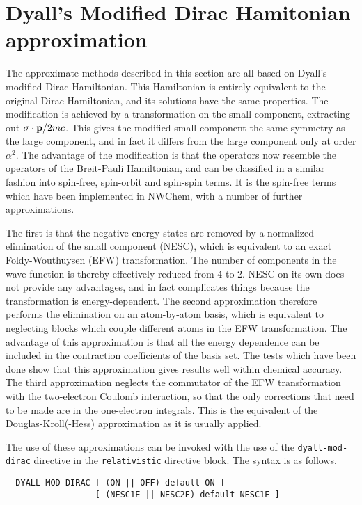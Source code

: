\section{Dyall's Modified Dirac Hamitonian approximation}
\label{sec:dyall-mod-dir}


The approximate methods described in this section are all based on Dyall's
modified Dirac Hamiltonian. This Hamiltonian is entirely equivalent to the
original Dirac Hamiltonian, and its solutions have the same properties.
The modification is achieved by a transformation on the small component,
extracting out \hbox{$\sigma\cdot{\bf p}/2mc$}. This gives the modified small
component the same symmetry as the large component, and in fact it differs
from the large component only at order $\alpha^2$.  The advantage of the
modification is that the operators now resemble the operators of the
Breit-Pauli Hamiltonian, and can be classified in a similar fashion into
spin-free, spin-orbit and spin-spin terms. It is the spin-free terms which
have been implemented in NWChem, with a number of further approximations.

The first is that the negative energy states are removed by a normalized
elimination of the small component (NESC), which is equivalent to an exact
Foldy-Wouthuysen (EFW) transformation. The number of components in the wave
function is thereby effectively reduced from 4 to 2. NESC on its own does
not provide any advantages, and in fact complicates things because the
transformation is energy-dependent. The second approximation therefore
performs the elimination on an atom-by-atom basis, which is equivalent to
neglecting blocks which couple different atoms in the EFW transformation.
The advantage of this approximation is that all the energy dependence can be
included in the contraction coefficients of the basis set.  The tests which
have been done show that this approximation gives results well within
chemical accuracy. The third approximation neglects the commutator of the
EFW transformation with the two-electron Coulomb interaction, so that the
only corrections that need to be made are in the one-electron integrals.
This is the equivalent of the Douglas-Kroll(-Hess) approximation as it is
usually applied.

The use of these approximations can be invoked with the use of the
\verb+dyall-mod-dirac+ directive in the \verb+relativistic+ directive block.
The syntax is as follows.

\begin{verbatim}
  DYALL-MOD-DIRAC [ (ON || OFF) default ON ] 
                  [ (NESC1E || NESC2E) default NESC1E ]

\end{verbatim}

